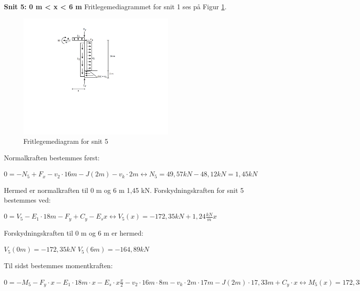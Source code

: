 \textbf{Snit 5: 0 m < x < 6 m}
\newline
Fritlegemediagrammet for snit 1 ses på Figur \ref{fig:snitfem}.

\begin{figure}[H]
	\centering
	\includegraphics[width=0.7\textwidth]{billeder/snitfem.png}
	\caption{Fritlegemediagram for snit 5}
	\label{fig:snitfem}
\end{figure}

Normalkraften bestemmes først:
\begin{center}
	$0 = -N_5 + F_x - v_2 \cdot 16m - J(2m) - v_k \cdot 2m \leftrightarrow N_5 = 49,\!57 kN - 48,\!12 kN = 1,\!45 kN$
\end{center}

Hermed er normalkraften til 0 m og 6 m 1,45 kN. 
\newline
\newline
Forskydningskraften for snit 5 bestemmes ved:
\begin{center}
	$0 = V_5 - E_1 \cdot 18 m - F_y + C_y - E_s x \leftrightarrow V_5(x) = -172,\!35 kN + 1,\!24 \frac{kN}{m}x$
\end{center}

Forskydningskraften til 0 m og 6 m er hermed:
\begin{center}
	$V_5(0m) = -172,\!35 kN$
	\newline
	$V_5(6m) = -164,\!89 kN$
\end{center}

Til sidst bestemmes momentkraften:
\begin{center}
	$0 = -M_5 - F_y \cdot x - E_1 \cdot 18 m \cdot x - E_s \cdot x \frac{x}{2} - v_2 \cdot 16 m \cdot 8 m - v_k \cdot 2 m \cdot 17 m - J(2m) \cdot 17,\!33 m + C_y \cdot x \leftrightarrow M_5(x) = 172,\!35 kN \cdot x - 0,\!62 \frac{kN}{m} \cdot x^2 -1011,\!72 kNm$
\end{center}

